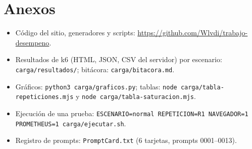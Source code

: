 \documentclass[11pt,a4paper]{article}
\newcommand{\codigo}[1]{\texttt{#1}}
\begin{document}
\section*{Anexos}

\begin{itemize}
  \item Código del sitio, generadores y scripts: \url{https://github.com/Wlvdi/trabajo-desempeno}.
  \item Resultados de k6 (HTML, JSON, CSV del servidor) por escenario:
        \codigo{carga/resultados/}; bitácora: \codigo{carga/bitacora.md}.
  \item Gráficos: \codigo{python3 carga/graficos.py}; tablas:
        \codigo{node carga/tabla-repeticiones.mjs} y
        \codigo{node carga/tabla-saturacion.mjs}.
  \item Ejecución de una prueba: \codigo{ESCENARIO=normal REPETICION=R1
        NAVEGADOR=1 PROMETHEUS=1 carga/ejecutar.sh}.
  \item Registro de prompts: \codigo{PromptCard.txt} (6 tarjetas, prompts 0001--0013).
\end{itemize}
\end{document}
